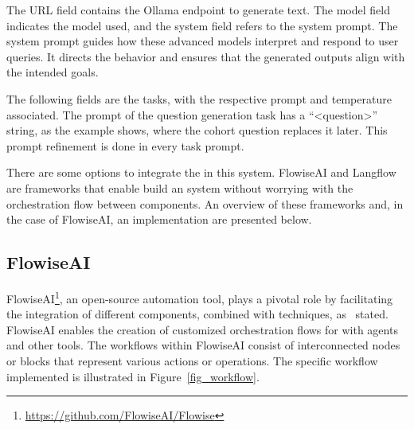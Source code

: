 The URL field contains the Ollama {\llm} endpoint to generate text. The model field indicates the {\llm} model used, and the system field refers to the system prompt. The system prompt guides how these advanced {\ai} models interpret and respond to user queries. It directs the {\llm} behavior and ensures that the generated outputs align with the intended goals. 

The following fields are the tasks, with the respective prompt and temperature associated. The prompt of the question generation task has a ``<question>'' string, as the example shows, where the cohort question replaces it later. This prompt refinement is done in every task prompt.





There are some options to integrate the {\llm} in this system. FlowiseAI and Langflow are frameworks that enable build an {\llm} system without worrying with the orchestration flow between components. An overview of these frameworks and, in the case of FlowiseAI, an implementation are presented below.



\subsection{FlowiseAI}
\label{flowise}

FlowiseAI\footnote{\url{https://github.com/FlowiseAI/Flowise}}, an open-source automation tool, plays a pivotal role by facilitating the integration of different {\ai} components, combined with {\ir} techniques, as~\citet{reis2024flowise} stated. FlowiseAI enables the creation of customized orchestration flows for {\llm} with {\ai} agents and other tools. The workflows within FlowiseAI consist of interconnected nodes or blocks that represent various actions or operations. The specific workflow implemented is illustrated in Figure~\ref{fig_workflow}.


